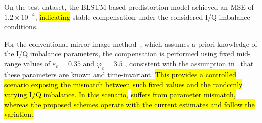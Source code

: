 \documentclass[lettersize,journal]{IEEEtran}
\begin{document}
On the test dataset, the BLSTM-based predistortion model achieved an MSE of $1.2 \times 10^{-4}$, \hl{indicating} stable compensation under the considered I/Q imbalance conditions.

For the conventional mirror image method~\cite{Mirror_Image}, which assumes a priori knowledge of the I/Q imbalance parameters, the compensation is performed using fixed mid-range values of $\varepsilon_c = 0.35$ and $\varphi_c = 3.5^\circ$, consistent with the assumption in~\cite{Mirror_Image} that these parameters are known and time-invariant.
\hl{This provides a controlled scenario exposing the mismatch between such fixed values and the randomly varying I/Q imbalance. In this scenario,} \cite{Mirror_Image} \hl{suffers from parameter mismatch, whereas the proposed schemes operate with the current estimates and follow the variation.}
 


\end{document}
